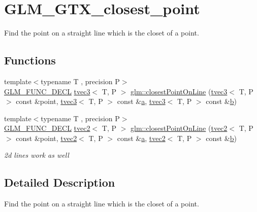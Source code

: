 \hypertarget{group__gtx__closest__point}{}\section{G\+L\+M\+\_\+\+G\+T\+X\+\_\+closest\+\_\+point}
\label{group__gtx__closest__point}


Find the point on a straight line which is the closet of a point.  


\subsection*{Functions}
\begin{DoxyCompactItemize}
\item 
{\footnotesize template$<$typename T , precision P$>$ }\\\mbox{\hyperlink{setup_8hpp_ab2d052de21a70539923e9bcbf6e83a51}{G\+L\+M\+\_\+\+F\+U\+N\+C\+\_\+\+D\+E\+CL}} \mbox{\hyperlink{structglm_1_1tvec3}{tvec3}}$<$ T, P $>$ \mbox{\hyperlink{group__gtx__closest__point_gac26353282a8213e469f5e33560c1200f}{glm\+::closest\+Point\+On\+Line}} (\mbox{\hyperlink{structglm_1_1tvec3}{tvec3}}$<$ T, P $>$ const \&point, \mbox{\hyperlink{structglm_1_1tvec3}{tvec3}}$<$ T, P $>$ const \&\mbox{\hyperlink{glad_8h_ac8729153468b5dcf13f971b21d84d4e5}{a}}, \mbox{\hyperlink{structglm_1_1tvec3}{tvec3}}$<$ T, P $>$ const \&\mbox{\hyperlink{glad_8h_a6eba317e3cf44d6d26c04a5a8f197dcb}{b}})
\item 
{\footnotesize template$<$typename T , precision P$>$ }\\\mbox{\hyperlink{setup_8hpp_ab2d052de21a70539923e9bcbf6e83a51}{G\+L\+M\+\_\+\+F\+U\+N\+C\+\_\+\+D\+E\+CL}} \mbox{\hyperlink{structglm_1_1tvec2}{tvec2}}$<$ T, P $>$ \mbox{\hyperlink{group__gtx__closest__point_gadc7010070bb0cacd284f560299b21660}{glm\+::closest\+Point\+On\+Line}} (\mbox{\hyperlink{structglm_1_1tvec2}{tvec2}}$<$ T, P $>$ const \&point, \mbox{\hyperlink{structglm_1_1tvec2}{tvec2}}$<$ T, P $>$ const \&\mbox{\hyperlink{glad_8h_ac8729153468b5dcf13f971b21d84d4e5}{a}}, \mbox{\hyperlink{structglm_1_1tvec2}{tvec2}}$<$ T, P $>$ const \&\mbox{\hyperlink{glad_8h_a6eba317e3cf44d6d26c04a5a8f197dcb}{b}})
\begin{DoxyCompactList}\small\item\em 2d lines work as well \end{DoxyCompactList}\end{DoxyCompactItemize}


\subsection{Detailed Description}
Find the point on a straight line which is the closet of a point. 

